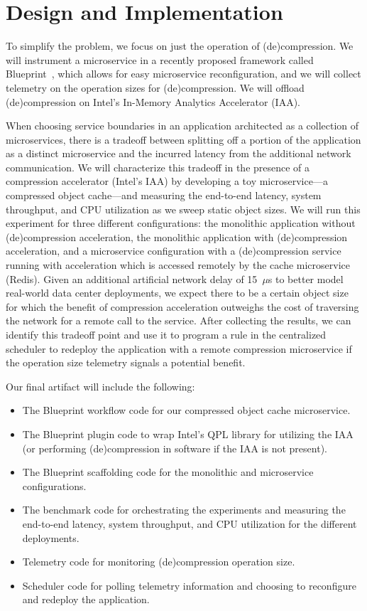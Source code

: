 \documentclass[letterpaper,twocolumn,10pt]{article}
\begin{document}
\section{Design and Implementation}
To simplify the problem, we focus on just the operation of (de)compression. We will instrument a microservice in a recently proposed framework called Blueprint~\cite{anand2023blueprint}, which allows for easy microservice reconfiguration, and we will collect telemetry on the operation sizes for (de)compression. We will offload (de)compression on Intel's In-Memory Analytics Accelerator (IAA).

When choosing service boundaries in an application architected as a collection of microservices, there is a tradeoff between splitting off a portion of the application as a distinct microservice and the incurred latency from the additional network communication. We will characterize this tradeoff in the presence of a compression accelerator (Intel's IAA) by developing a toy microservice---a compressed object cache---and measuring the end-to-end latency, system throughput, and CPU utilization as we sweep static object sizes. We will run this experiment for three different configurations: the monolithic application without (de)compression acceleration, the monolithic application with (de)compression acceleration, and a microservice configuration with a (de)compression service running with acceleration which is accessed remotely by the cache microservice (Redis). Given an additional artificial network delay of 15~$\mu$s to better model real-world data center deployments, we expect there to be a certain object size for which the benefit of compression acceleration outweighs the cost of traversing the network for a remote call to the service. After collecting the results, we can identify this tradeoff point and use it to program a rule in the centralized scheduler to redeploy the application with a remote compression microservice if the operation size telemetry signals a potential benefit.

Our final artifact will include the following:
\begin{itemize}
    \item The Blueprint workflow code for our compressed object cache microservice.
    \item The Blueprint plugin code to wrap Intel's QPL library for utilizing the IAA (or performing (de)compression in software if the IAA is not present).
    \item The Blueprint scaffolding code for the monolithic and microservice configurations.
    \item The benchmark code for orchestrating the experiments and measuring the end-to-end latency, system throughput, and CPU utilization for the different deployments.
    \item Telemetry code for monitoring (de)compression operation size.
    \item Scheduler code for polling telemetry information and choosing to reconfigure and redeploy the application.
\end{itemize}



\end{document}
